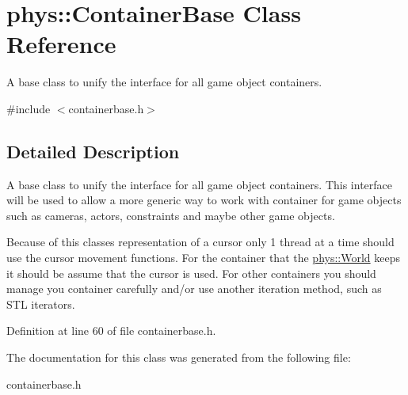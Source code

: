 \hypertarget{classphys_1_1ContainerBase}{
\section{phys::ContainerBase Class Reference}
\label{d5/d8b/classphys_1_1ContainerBase}
}


A base class to unify the interface for all game object containers.  




{\ttfamily \#include $<$containerbase.h$>$}



\subsection{Detailed Description}
A base class to unify the interface for all game object containers. This interface will be used to allow a more generic way to work with container for game objects such as cameras, actors, constraints and maybe other game objects. \par
\par
 Because of this classes representation of a cursor only 1 thread at a time should use the cursor movement functions. For the container that the \hyperlink{classphys_1_1World}{phys::World} keeps it should be assume that the cursor is used. For other containers you should manage you container carefully and/or use another iteration method, such as STL iterators. 

Definition at line 60 of file containerbase.h.



The documentation for this class was generated from the following file:\begin{DoxyCompactItemize}
\item 
containerbase.h\end{DoxyCompactItemize}
